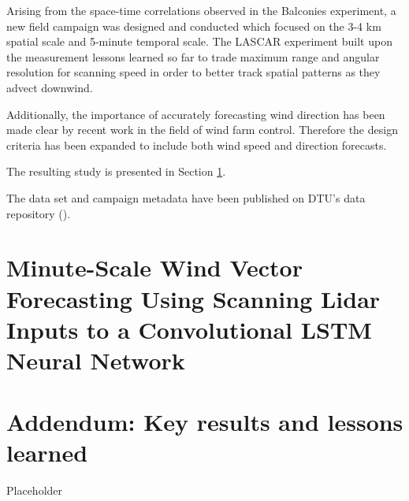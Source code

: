 Arising from the space-time correlations observed in the Balconies experiment, a new field campaign was designed and conducted which focused on the 3-4 km spatial scale and 5-minute temporal scale. The LASCAR experiment built upon the measurement lessons learned so far to trade maximum range and angular resolution for scanning speed in order to better track spatial patterns as they advect downwind.

Additionally, the importance of accurately forecasting wind direction has been made clear by recent work in the field of wind farm control. Therefore the design criteria has been expanded to include both wind speed and direction forecasts.

\noindent
The resulting study is presented in Section \ref{sec:lascar_paper}.

\noindent
The data set and campaign metadata have been published on DTU's data repository (\cite{lascar_dataset}).

\clearpage
\section{Minute-Scale Wind Vector Forecasting Using Scanning Lidar Inputs to a Convolutional LSTM Neural Network}
\label{sec:lascar_paper}



\clearpage
\section{Addendum: Key results and lessons learned}
\label{sec:lascar_addendum}

Placeholder